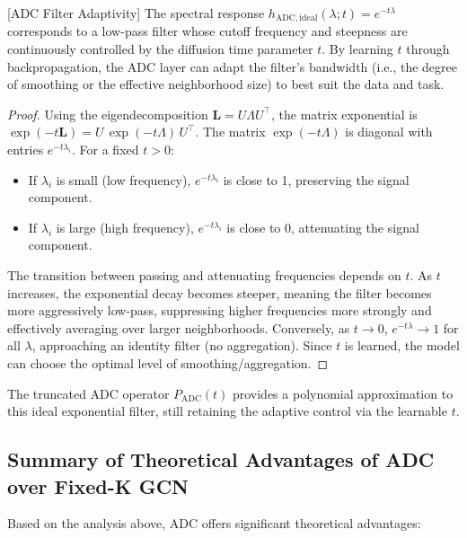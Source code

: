 \begin{theorem}\label{thm:adc_adaptivity}[ADC Filter Adaptivity]
The spectral response $h_{\mathrm{ADC, ideal}}(\lambda;t) = e^{-t\lambda}$ corresponds to a low-pass filter whose cutoff frequency and steepness are continuously controlled by the diffusion time parameter $t$. By learning $t$ through backpropagation, the ADC layer can adapt the filter's bandwidth (i.e., the degree of smoothing or the effective neighborhood size) to best suit the data and task.
\end{theorem}

\begin{proof}
Using the eigendecomposition $\mathbf{L}=U\Lambda U^\top$, the matrix exponential is $\exp(-t\mathbf{L}) = U\,\exp(-t\Lambda)\,U^\top$. The matrix $\exp(-t\Lambda)$ is diagonal with entries $e^{-t\lambda_i}$.
For a fixed $t > 0$:
\begin{itemize}
    \item If $\lambda_i$ is small (low frequency), $e^{-t\lambda_i}$ is close to 1, preserving the signal component.
    \item If $\lambda_i$ is large (high frequency), $e^{-t\lambda_i}$ is close to 0, attenuating the signal component.
\end{itemize}
The transition between passing and attenuating frequencies depends on $t$. As $t$ increases, the exponential decay becomes steeper, meaning the filter becomes more aggressively low-pass, suppressing higher frequencies more strongly and effectively averaging over larger neighborhoods. Conversely, as $t \to 0$, $e^{-t\lambda} \to 1$ for all $\lambda$, approaching an identity filter (no aggregation). Since $t$ is learned, the model can choose the optimal level of smoothing/aggregation.
\end{proof}

The truncated ADC operator $P_{\mathrm{ADC}}(t)$ provides a polynomial approximation to this ideal exponential filter, still retaining the adaptive control via the learnable $t$.

\subsection{Summary of Theoretical Advantages of ADC over Fixed-K GCN}
Based on the analysis above, ADC offers significant theoretical advantages:

